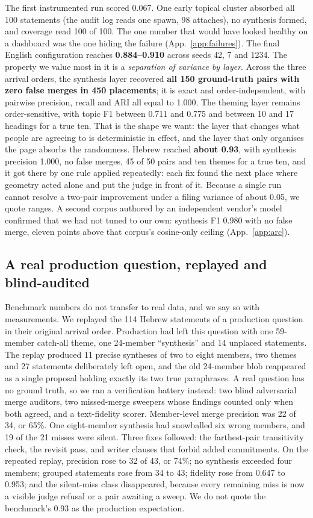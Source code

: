 \documentclass{article}
\newcommand{\hl}[1]{\textbf{#1}}
\begin{document}
The first instrumented run scored 0.067. One early topical cluster absorbed all 100 statements (the audit log reads one spawn, 98 attaches), no synthesis formed, and coverage read 100 of 100. The one number that would have looked healthy on a dashboard was the one hiding the failure (App.~\ref{app:failures}). The final English configuration reaches \hl{0.884--0.910} across seeds 42, 7 and 1234. The property we value most in it is a \emph{separation of variance by layer}. Across the three arrival orders, the synthesis layer recovered \hl{all 150 ground-truth pairs with zero false merges in 450 placements}; it is exact and order-independent, with pairwise precision, recall and ARI all equal to 1.000. The theming layer remains order-sensitive, with topic F1 between 0.711 and 0.775 and between 10 and 17 headings for a true ten. That is the shape we want: the layer that changes what people are agreeing to is deterministic in effect, and the layer that only organises the page absorbs the randomness. Hebrew reached \hl{about 0.93}, with synthesis precision 1.000, no false merges, 45 of 50 pairs and ten themes for a true ten, and it got there by one rule applied repeatedly: each fix found the next place where geometry acted alone and put the judge in front of it. Because a single run cannot resolve a two-pair improvement under a filing variance of about 0.05, we quote ranges. A second corpus authored by an independent vendor's model confirmed that we had not tuned to our own: synthesis F1 0.980 with no false merge, eleven points above that corpus's cosine-only ceiling (App.~\ref{app:arc}).

\subsection{A real production question, replayed and blind-audited}
\label{sec:replay}
Benchmark numbers do not transfer to real data, and we say so with measurements. We replayed the 114 Hebrew statements of a production question in their original arrival order. Production had left this question with one 59-member catch-all theme, one 24-member ``synthesis'' and 14 unplaced statements. The replay produced 11 precise syntheses of two to eight members, two themes and 27 statements deliberately left open, and the old 24-member blob reappeared as a single proposal holding exactly its two true paraphrases. A real question has no ground truth, so we ran a verification battery instead: two blind adversarial merge auditors, two missed-merge sweepers whose findings counted only when both agreed, and a text-fidelity scorer. Member-level merge precision was 22 of 34, or 65\%. One eight-member synthesis had snowballed six wrong members, and 19 of the 21 misses were silent. Three fixes followed: the farthest-pair transitivity check, the revisit pass, and writer clauses that forbid added commitments. On the repeated replay, precision rose to 32 of 43, or 74\%; no synthesis exceeded four members; grouped statements rose from 34 to 43; fidelity rose from 0.647 to 0.953; and the silent-miss class disappeared, because every remaining miss is now a visible judge refusal or a pair awaiting a sweep. We do not quote the benchmark's 0.93 as the production expectation.
\end{document}
